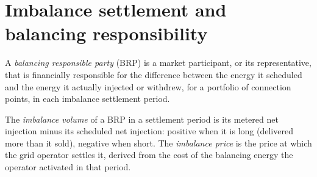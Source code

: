\begin{omfigure}
\centering
{}

\label{fig:m3:power-markets-trading:timeline}
\end{omfigure}

\section{Imbalance settlement and balancing responsibility}

\begin{definition}\label{def:m3:power-markets-trading:brp}
A \emph{balancing responsible party} (BRP) is a market
participant, or its representative, that is financially responsible for the difference between
the energy it scheduled and the energy it actually injected or withdrew, for a portfolio of
connection points, in each imbalance settlement period.
\end{definition}

\begin{definition}\label{def:m3:power-markets-trading:imbalance}
The \emph{imbalance volume} of a BRP in a settlement period is its
metered net injection minus its scheduled net injection: positive when it is long (delivered
more than it sold), negative when short. The \emph{imbalance price} is
the price at which the grid operator settles it, derived from the cost of the balancing energy
the operator activated in that period.
\end{definition}

